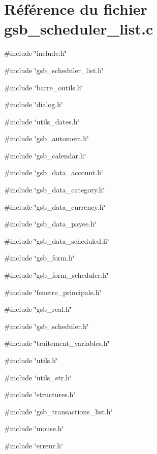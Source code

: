 \section{Référence du fichier gsb\_\-scheduler\_\-list.c}
\label{gsb__scheduler__list_8c}
{\ttfamily \#include \char`\"{}include.h\char`\"{}}\par
{\ttfamily \#include \char`\"{}gsb\_\-scheduler\_\-list.h\char`\"{}}\par
{\ttfamily \#include \char`\"{}barre\_\-outils.h\char`\"{}}\par
{\ttfamily \#include \char`\"{}dialog.h\char`\"{}}\par
{\ttfamily \#include \char`\"{}utils\_\-dates.h\char`\"{}}\par
{\ttfamily \#include \char`\"{}gsb\_\-automem.h\char`\"{}}\par
{\ttfamily \#include \char`\"{}gsb\_\-calendar.h\char`\"{}}\par
{\ttfamily \#include \char`\"{}gsb\_\-data\_\-account.h\char`\"{}}\par
{\ttfamily \#include \char`\"{}gsb\_\-data\_\-category.h\char`\"{}}\par
{\ttfamily \#include \char`\"{}gsb\_\-data\_\-currency.h\char`\"{}}\par
{\ttfamily \#include \char`\"{}gsb\_\-data\_\-payee.h\char`\"{}}\par
{\ttfamily \#include \char`\"{}gsb\_\-data\_\-scheduled.h\char`\"{}}\par
{\ttfamily \#include \char`\"{}gsb\_\-form.h\char`\"{}}\par
{\ttfamily \#include \char`\"{}gsb\_\-form\_\-scheduler.h\char`\"{}}\par
{\ttfamily \#include \char`\"{}fenetre\_\-principale.h\char`\"{}}\par
{\ttfamily \#include \char`\"{}gsb\_\-real.h\char`\"{}}\par
{\ttfamily \#include \char`\"{}gsb\_\-scheduler.h\char`\"{}}\par
{\ttfamily \#include \char`\"{}traitement\_\-variables.h\char`\"{}}\par
{\ttfamily \#include \char`\"{}utils.h\char`\"{}}\par
{\ttfamily \#include \char`\"{}utils\_\-str.h\char`\"{}}\par
{\ttfamily \#include \char`\"{}structures.h\char`\"{}}\par
{\ttfamily \#include \char`\"{}gsb\_\-transactions\_\-list.h\char`\"{}}\par
{\ttfamily \#include \char`\"{}mouse.h\char`\"{}}\par
{\ttfamily \#include \char`\"{}erreur.h\char`\"{}}\par
